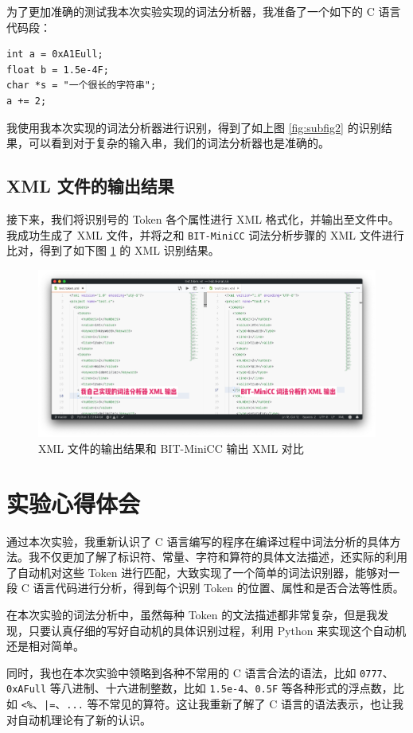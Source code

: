 \documentclass[UTF8]{ctexart}
\begin{document}
为了更加准确的测试我本次实验实现的词法分析器，我准备了一个如下的 C 语言代码段：

\begin{verbatim}
int a = 0xA1Eull;
float b = 1.5e-4F;
char *s = "一个很长的字符串";
a += 2;
\end{verbatim}

我使用我本次实现的词法分析器进行识别，得到了如上图 \ref{fig:subfig2} 的识别结果，可以看到对于复杂的输入串，我们的词法分析器也是准确的。

\subsection{XML 文件的输出结果}

接下来，我们将识别号的 Token 各个属性进行 XML 格式化，并输出至文件中。我成功生成了 XML 文件，并将之和 \texttt{BIT-MiniCC} 词法分析步骤的 XML 文件进行比对，得到了如下图 \ref{fig:figure7} 的 XML 识别结果。

\begin{figure}[h]
  \centering
  \includegraphics[width=\linewidth]{images/XML.png}
  \caption{XML 文件的输出结果和 BIT-MiniCC 输出 XML 对比}
  \label{fig:figure7}
\end{figure}

\section{实验心得体会}
通过本次实验，我重新认识了 C 语言编写的程序在编译过程中词法分析的具体方法。我不仅更加了解了标识符、常量、字符和算符的具体文法描述，还实际的利用了自动机对这些 Token 进行匹配，大致实现了一个简单的词法识别器，能够对一段 C 语言代码进行分析，得到每个识别 Token 的位置、属性和是否合法等性质。

在本次实验的词法分析中，虽然每种 Token 的文法描述都非常复杂，但是我发现，只要认真仔细的写好自动机的具体识别过程，利用 Python 来实现这个自动机还是相对简单。

同时，我也在本次实验中领略到各种不常用的 C 语言合法的语法，比如 \texttt{0777}、\texttt{0xAFull} 等八进制、十六进制整数，比如 \texttt{1.5e-4}、\texttt{0.5F} 等各种形式的浮点数，比如 \texttt{<\%}、\texttt{|=}、\texttt{...} 等不常见的算符。这让我重新了解了 C 语言的语法表示，也让我对自动机理论有了新的认识。
\end{document}
